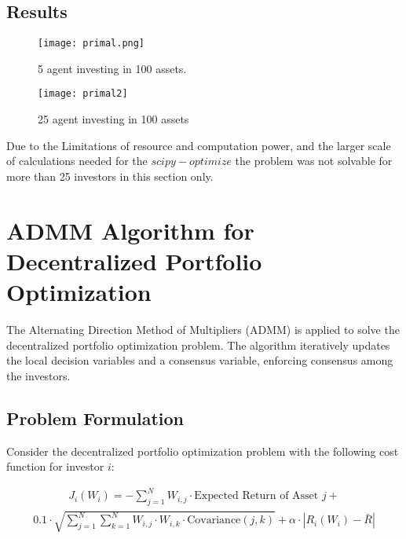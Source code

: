 \documentclass{article}
\begin{document}
	\subsection{Results}
	
		\begin{figure}[h]
		\begin{minipage}{0.49\linewidth}
			\centering
			\texttt{[image: primal.png]}
			\caption{5 agent investing in 100 assets.}
		\end{minipage}
		\begin{minipage}{0.49\linewidth}
			\centering
			\texttt{[image: primal2]}
			\caption{25 agent investing in 100 assets}
		\end{minipage}
		\label{figt}
	\end{figure}
	Due to the Limitations of resource and computation power, and the larger scale of calculations needed for the $scipy-optimize$ the problem was not solvable for more than 25 investors in this section only.
	\pagebreak
	\section*{ADMM Algorithm for Decentralized Portfolio Optimization}
	

	
	The Alternating Direction Method of Multipliers (ADMM) is applied to solve the decentralized portfolio optimization problem. The algorithm iteratively updates the local decision variables and a consensus variable, enforcing consensus among the investors.
	
	\subsection*{Problem Formulation}
	
	Consider the decentralized portfolio optimization problem with the following cost function for investor $i$:
	
	\[
	\begin{aligned}
		J_i(W_i) = -\sum_{j=1}^{N} W_{i,j} \cdot \text{Expected Return of Asset } j +
	\end{aligned}
	\]
	\[
	\begin{aligned}
		0.1 \cdot \sqrt{\sum_{j=1}^{N} \sum_{k=1}^{N} W_{i,j} \cdot W_{i,k} \cdot \text{Covariance}(j, k)} + \alpha \cdot \left|R_i(W_i) - \bar{R}\right|
	\end{aligned}
	\]
	
\end{document}
